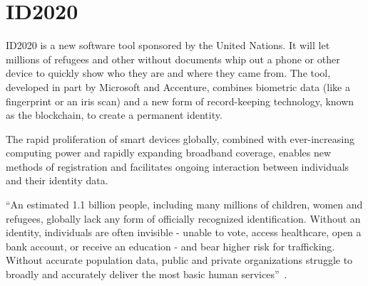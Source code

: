 \section{ID2020}

ID2020 is a new software tool sponsored by the United Nations. It will
let millions of refugees and other without documents whip out a phone
or other device to quickly show who they are and where they came
from. The tool, developed in part by Microsoft and Accenture, combines
biometric data (like a fingerprint or an iris scan) and a new form of
record-keeping technology, known as the blockchain, to create a
permanent identity.
 
The rapid proliferation of smart devices globally, combined with
ever-increasing computing power and rapidly expanding broadband
coverage, enables new methods of registration and facilitates ongoing
interaction between individuals and their identity data.
 
``An estimated 1.1 billion people, including many millions of
children, women and refugees, globally lack any form of officially
recognized identification. Without an identity, individuals are often
invisible - unable to vote, access healthcare, open a bank account, or
receive an education - and bear higher risk for trafficking. Without
accurate population data, public and private organizations struggle to
broadly and accurately deliver the most basic human
services''~\cite{hid-sp18-506-NoID}.
